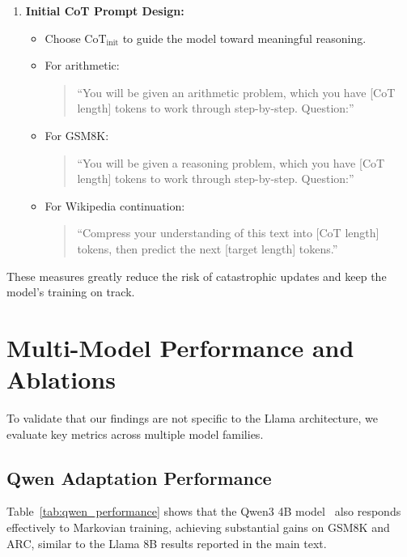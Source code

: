 \documentclass{article} %
\begin{document}
\begin{enumerate}
    \item \textbf{Initial CoT Prompt Design:} 
    \begin{itemize}
        \item Choose $\text{CoT}_{\text{init}}$ to guide the model toward meaningful reasoning. 
        \item For arithmetic: 
        \begin{quote}
            \small
            ``You will be given an arithmetic problem, which you have [CoT length] tokens to work through step-by-step. Question:''
        \end{quote}
        \item For GSM8K:
        \begin{quote}
            \small
            ``You will be given a reasoning problem, which you have [CoT length] tokens to work through step-by-step. Question:''
        \end{quote}
        \item For Wikipedia continuation:
        \begin{quote}
            \small
            ``Compress your understanding of this text into [CoT length] tokens, then predict the next [target length] tokens.''
        \end{quote}
    \end{itemize}
\end{enumerate}

These measures greatly reduce the risk of catastrophic updates and keep the model's training on track.

\section{Multi-Model Performance and Ablations}
\label{app:multi_model}

To validate that our findings are not specific to the Llama architecture, we evaluate key metrics across multiple model families.

\subsection{Qwen Adaptation Performance}
Table~\ref{tab:qwen_performance} shows that the Qwen3 4B model~\citep{yang2025qwen3technicalreport} also responds effectively to Markovian training, achieving substantial gains on GSM8K and ARC, similar to the Llama 8B results reported in the main text.
\end{document}
